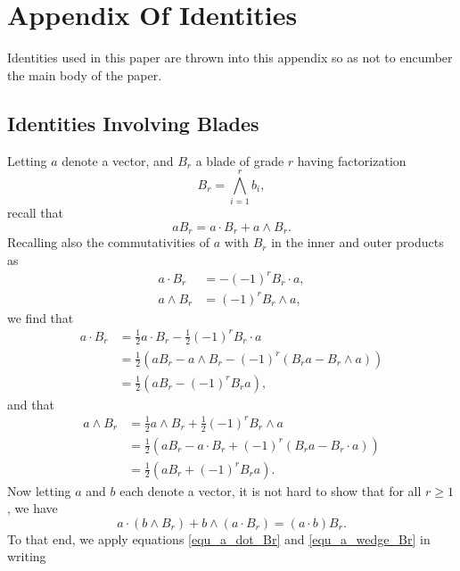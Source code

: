 \documentclass{birkjour}
\theoremstyle{definition}
\theoremstyle{remark}
\numberwithin{equation}{section}
\begin{document}
\section{Appendix Of Identities}

Identities used in this paper are thrown into this appendix so as not to encumber the main body of the paper.

\subsection{Identities Involving Blades}

Letting $a$ denote a vector, and $B_r$ a blade of grade $r$ having factorization
\begin{equation}\label{equ_B_r}
B_r = \bigwedge_{i=1}^r b_i,
\end{equation}
recall that
\begin{equation}\label{equ_aBr_is_a_dot_Br_and_a_wedge_Br}
aB_r = a\cdot B_r + a\wedge B_r.
\end{equation}
Recalling also the commutativities of $a$ with $B_r$ in the inner and outer products as
\begin{align}
a\cdot B_r &= -(-1)^r B_r\cdot a,\label{equ_a_dot_Br_commutativity} \\
a\wedge B_r &= (-1)^r B_r\wedge a,\label{equ_a_wedge_Br_commutativity}
\end{align}
we find that
\begin{align}
a\cdot B_r &= \frac{1}{2}a\cdot B_r - \frac{1}{2}(-1)^r B_r\cdot a\nonumber \\
 &= \frac{1}{2}(aB_r - a\wedge B_r - (-1)^r(B_ra - B_r\wedge a))\nonumber \\
 &= \frac{1}{2}(aB_r-(-1)^rB_ra),\label{equ_a_dot_Br}
\end{align}
and that
\begin{align}
a\wedge B_r &= \frac{1}{2}a\wedge B_r + \frac{1}{2}(-1)^r B_r\wedge a\nonumber \\
 &= \frac{1}{2}(aB_r - a\cdot B_r + (-1)^r(B_ra - B_r\cdot a))\nonumber \\
 &= \frac{1}{2}(aB_r+(-1)^rB_ra).\label{equ_a_wedge_Br}
\end{align}
Now letting $a$ and $b$ each denote a vector, it is not hard to show that for all $r\geq 1$, we have
\begin{equation}\label{equ_a_dot_b_wedge_Br_identity}
a\cdot(b\wedge B_r) + b\wedge(a\cdot B_r) = (a\cdot b)B_r.
\end{equation}
To that end, we apply equations \eqref{equ_a_dot_Br} and \eqref{equ_a_wedge_Br} in writing
\end{document}

